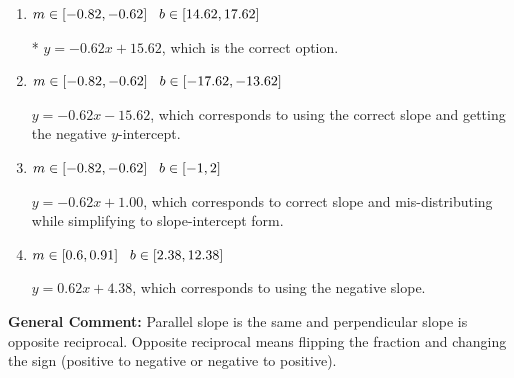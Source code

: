 \documentclass{extbook}[14pt]
\begin{document}
\begin{enumerate}
{\begin{enumerate}[label=\Alph*.]
 $y = -1.60x + 15.62$, which corresponds to using the reciprocal slope $(1/m)$.
\item \( m \in [-0.82, -0.62] \hspace*{3mm} b \in [14.62, 17.62] \)

* $y = -0.62x + 15.62$, which is the correct option.
\item \( m \in [-0.82, -0.62] \hspace*{3mm} b \in [-17.62, -13.62] \)

 $y = -0.62x - 15.62$, which corresponds to using the correct slope and getting the negative $y$-intercept.
\item \( m \in [-0.82, -0.62] \hspace*{3mm} b \in [-1, 2] \)

 $y = -0.62x + 1.00$, which corresponds to correct slope and mis-distributing while simplifying to slope-intercept form.
\item \( m \in [0.6, 0.91] \hspace*{3mm} b \in [2.38, 12.38] \)

 $y = 0.62x + 4.38$, which corresponds to using the negative slope.
\end{enumerate}

\textbf{General Comment:} Parallel slope is the same and perpendicular slope is opposite reciprocal. Opposite reciprocal means flipping the fraction and changing the sign (positive to negative or negative to positive).
}
\end{enumerate}
\end{document}
